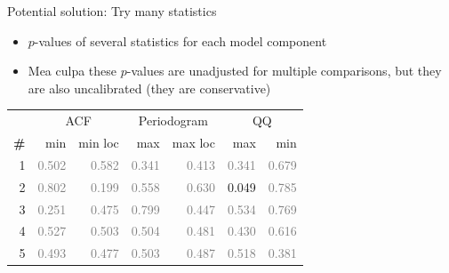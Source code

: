 \begin{frame}{Potential solution: Try many statistics}

\begin{itemize}
  \item $p$-values of several statistics for each model component
  \item Mea culpa these $p$-values are unadjusted for multiple comparisons, but they are also uncalibrated (they are conservative)
\end{itemize}

\vspace{\baselineskip}

\begin{center}
\begin{tabular}{|r|rr|rr|rr|}
\hline
 & \multicolumn{2}{c|}{ACF} & \multicolumn{2}{c|}{Periodogram} & \multicolumn{2}{c|}{QQ} \\
\bf{\#} & {min} & {min loc} & {max} & {max loc} & {max} & {min}\\
\hline

1 & \textcolor{gray}{0.502} & \textcolor{gray}{0.582} & \textcolor{gray}{0.341} & \textcolor{gray}{0.413} & \textcolor{gray}{0.341} & \textcolor{gray}{0.679}\\

2 & \textcolor{gray}{0.802} & \textcolor{gray}{0.199} & \textcolor{gray}{0.558} & \textcolor{gray}{0.630} & 0.049 & \textcolor{gray}{0.785}\\

3 & \textcolor{gray}{0.251} & \textcolor{gray}{0.475} & \textcolor{gray}{0.799} & \textcolor{gray}{0.447} & \textcolor{gray}{0.534} & \textcolor{gray}{0.769}\\

4 & \textcolor{gray}{0.527} & \textcolor{gray}{0.503} & \textcolor{gray}{0.504} & \textcolor{gray}{0.481} & \textcolor{gray}{0.430} & \textcolor{gray}{0.616}\\

5 & \textcolor{gray}{0.493} & \textcolor{gray}{0.477} & \textcolor{gray}{0.503} & \textcolor{gray}{0.487} & \textcolor{gray}{0.518} & \textcolor{gray}{0.381}\\

\hline
\end{tabular}
\end{center}

\end{frame}

